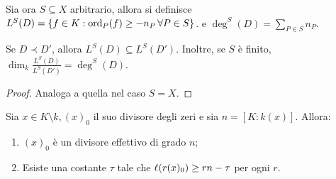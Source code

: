         Sia ora $S \subseteq X$ arbitrario, allora si definisce $L^S(D) = \{
        f \in K : \text{ord}_P(f) \geq -n_P \, \forall P \in S\}$. e $\deg^S(D) = 
        \sum_{P \in S} n_P$.
        \begin{lemma}
            Se $D \prec D'$, allora $L^S(D) \subseteq L^S(D')$. Inoltre, se 
            $S$ è finito, $\dim_k \frac{L^S(D)}{L^S(D')} = \deg^S(D)$.
        \end{lemma}
        \begin{proof}
            Analoga a quella nel caso $S = X$.
        \end{proof}
        \begin{proposizione} \label{prop:techn4}
            Sia $x \in K \setminus k, (x)_0$ il suo divisore degli zeri e sia 
            $n = [K:k(x)]$. Allora: \begin{enumerate}
                \item $(x)_0$ è un divisore effettivo di grado $n$;
                \item Esiste una costante $\tau$ tale che $\ell(r(x)_0) \geq rn 
                - \tau$ per ogni $r$.
            \end{enumerate}
        \end{proposizione}
